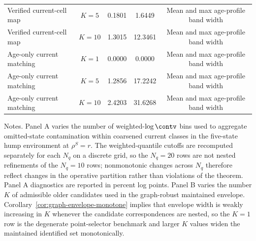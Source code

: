 \begin{table}[t]
{\begin{tabular}{>{\raggedright\arraybackslash}p{}cccc}
Verified current-cell map & $K=5$ & 0.1801 & 1.6449 & Mean and max age-profile band width \\
Verified current-cell map & $K=10$ & 1.3015 & 12.3461 & Mean and max age-profile band width \\
Age-only current matching & $K=1$ & 0.0000 & 0.0000 & Mean and max age-profile band width \\
Age-only current matching & $K=5$ & 1.2856 & 17.2242 & Mean and max age-profile band width \\
Age-only current matching & $K=10$ & 2.4203 & 31.6268 & Mean and max age-profile band width \\
\bottomrule
\end{tabular}%
}
\begin{minipage}{0.97\textwidth}
\footnotesize Notes. Panel A varies the number of weighted-$\log\contv$ bins used to aggregate omitted-state contamination within coarsened current classes in the five-state hump environment at $\rho^{S}=r$. The weighted-quantile cutoffs are recomputed separately for each $N_q$ on a discrete grid, so the $N_q=20$ rows are not nested refinements of the $N_q=10$ rows; nonmonotonic changes across $N_q$ therefore reflect changes in the operative partition rather than violations of the theorem. Panel A diagnostics are reported in percent log points. Panel B varies the number $K$ of admissible older candidates used in the graph-robust maintained envelope. Corollary~\ref{cor:graph-envelope-monotone} implies that envelope width is weakly increasing in $K$ whenever the candidate correspondences are nested, so the $K=1$ row is the degenerate point-selector benchmark and larger $K$ values widen the maintained identified set monotonically.
\end{minipage}
\end{table}
